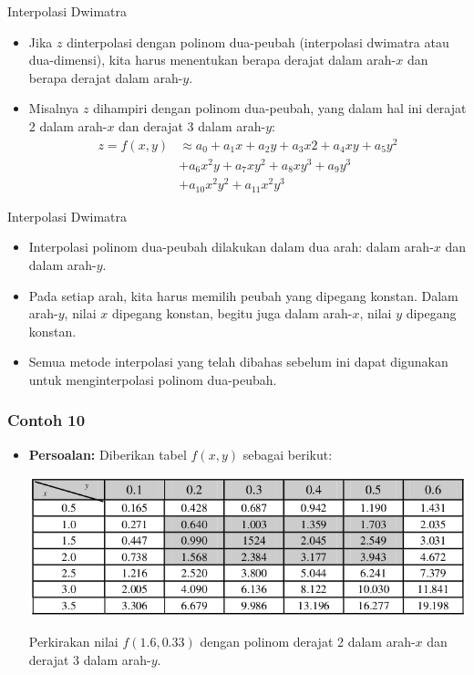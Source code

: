 \documentclass[pdflatex,compress,mathserif]{beamer}
\begin{document}
\begin{frame}{Interpolasi Dwimatra}
	\begin{itemize}
		\item Jika $ z $ dinterpolasi dengan polinom dua-peubah (interpolasi dwimatra atau dua-dimensi), kita harus menentukan berapa derajat dalam arah-$ x $ dan berapa derajat dalam arah-$ y $.
		\item Misalnya $ z $ dihampiri dengan polinom dua-peubah, yang dalam hal ini derajat 2 dalam arah-$ x $ dan derajat 3 dalam arah-$ y $:
		\begin{align*}
			z = f(x,y) &\approx a_0 + a_1 x + a_2 y + a_3 x 2 + a_4 xy + a_5 y^2 \\
			& + a_6 x^2 y + a_7 xy^2 + a_8 xy^3 + a_9 y^3 \\
			&+ a_{10} x^2 y^2 + a_{11} x^2 y^3
		\end{align*}
	\end{itemize}
\end{frame}

\begin{frame}{Interpolasi Dwimatra}
	\begin{itemize}
		\item Interpolasi polinom dua-peubah dilakukan dalam dua arah: dalam arah-$ x $ dan dalam arah-$ y $.
		\item Pada setiap arah, kita harus memilih peubah yang dipegang konstan. Dalam arah-$ y $, nilai $ x $ dipegang konstan, begitu juga dalam arah-$ x $, nilai $ y $ dipegang konstan.
		\item Semua metode interpolasi yang telah dibahas sebelum ini dapat digunakan untuk menginterpolasi polinom dua-peubah.
	\end{itemize}
\end{frame}

\begin{frame}
	\frametitle{Contoh 10}
	\begin{itemize}
		\item \textbf{Persoalan:} Diberikan tabel $ f(x,y) $ sebagai berikut:
		\begin{center}
			\includegraphics[width=\linewidth]{img/img29}
		\end{center}
		Perkirakan nilai $ f(1.6, 0.33) $ dengan polinom derajat 2 dalam arah-$ x $ dan derajat 3 dalam arah-$ y $.
	\end{itemize}
\end{frame}
\end{document}
